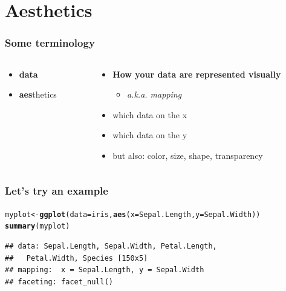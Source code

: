\documentclass{beamer}\usepackage[]{graphicx}\usepackage[]{color}
\makeatletter
\newcommand{\hlstd}[1]{\textcolor[rgb]{0.345,0.345,0.345}{#1}}%
\newcommand{\hlkwb}[1]{\textcolor[rgb]{0.69,0.353,0.396}{#1}}%
\newcommand{\hlkwc}[1]{\textcolor[rgb]{0.333,0.667,0.333}{#1}}%
\newcommand{\hlkwd}[1]{\textcolor[rgb]{0.737,0.353,0.396}{\textbf{#1}}}%
\newenvironment{kframe}{%
 \def\at@end@of@kframe{}%
 \ifinner\ifhmode%
  \def\at@end@of@kframe{\end{minipage}}%
  \begin{minipage}{\columnwidth}%
 \fi\fi%
 \def\FrameCommand##1{\hskip\@totalleftmargin \hskip-\fboxsep
 \colorbox{shadecolor}{##1}\hskip-\fboxsep
     \hskip-\linewidth \hskip-\@totalleftmargin \hskip\columnwidth}%
 \MakeFramed {\advance\hsize-\width
   \@totalleftmargin\z@ \linewidth\hsize
   \@setminipage}}%
 {\par\unskip\endMakeFramed%
 \at@end@of@kframe}
\newenvironment{knitrout}{}{} %
\makeatother
\begin{document}

\section*{Aesthetics}
\frame{\sectionpage}



\begin{frame}[fragile]
\frametitle{Some terminology}
\begin{columns}[t]

\begin{column}[T]{3cm}
\begin{itemize}
    \item \textbf{\color{gray}data}
    \item \textbf{aes}thetics
\end{itemize}
\end{column}

\begin{column}[T]{8cm}
\begin{itemize}
    \item \textbf{How your data are represented visually}
        \begin{itemize}
        \item \emph{a.k.a. mapping}
        \end{itemize}
    \item which data on the x
    \item which data on the y
    \item but also: {\color{red}color}, {\LARGE{size}}, shape, transparency
\end{itemize}
\end{column}

\end{columns}
\end{frame}


\begin{frame}[fragile]
\frametitle{Let's try an example}
\begin{knitrout}\footnotesize
{}\color{fgcolor}\begin{kframe}
\begin{alltt}
\hlstd{myplot} \hlkwb{<-} \hlkwd{ggplot}\hlstd{(}\hlkwc{data} \hlstd{= iris,} \hlkwd{aes}\hlstd{(}\hlkwc{x} \hlstd{= Sepal.Length,} \hlkwc{y} \hlstd{= Sepal.Width))}
\hlkwd{summary}\hlstd{(myplot)}
\end{alltt}
\begin{verbatim}
## data: Sepal.Length, Sepal.Width, Petal.Length,
##   Petal.Width, Species [150x5]
## mapping:  x = Sepal.Length, y = Sepal.Width
## faceting: facet_null()
\end{verbatim}
\end{kframe}
\end{knitrout}
\end{frame}
\end{document}
